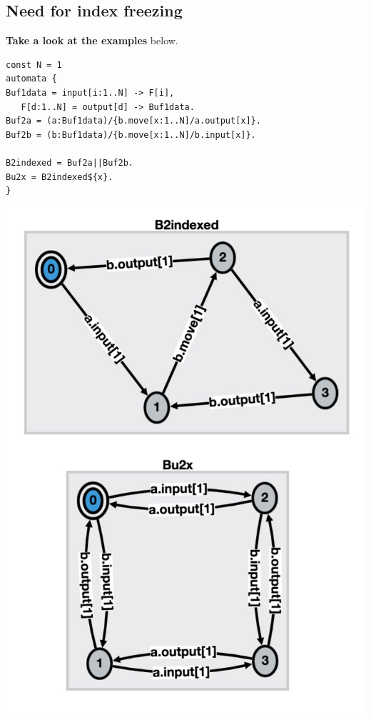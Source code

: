 \documentclass[]{article}
\begin{document}
\subsection{Need for index freezing }
{\color{red}

\begin{minipage}{0.55\textwidth}
{\bf Take a look at the examples} below.

\begin{verbatim}
const N = 1
automata {
Buf1data = input[i:1..N] -> F[i],
   F[d:1..N] = output[d] -> Buf1data.
Buf2a = (a:Buf1data)/{b.move[x:1..N]/a.output[x]}.
Buf2b = (b:Buf1data)/{b.move[x:1..N]/b.input[x]}.

B2indexed = Buf2a||Buf2b.
Bu2x = B2indexed${x}.
}
   \end{verbatim}
\end{minipage}\begin{minipage}{0.35\textwidth}
\begin{center}\includegraphics[scale=0.17]{hideB.jpg}\end{center}
\end{minipage}

}
\end{document}
